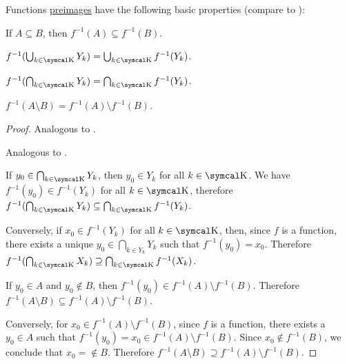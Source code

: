 \begin{proposition}\label{thm:function_preimage_properties}
  Functions \hyperref[def:function/preimage]{preimages} have the following basic properties (compare to ):
  \begin{PropEnum}
     If \( A \subseteq B \), then \( f^{-1}(A) \subseteq f^{-1}(B) \).

     \( f^{-1}(\bigcup_{k \in \CK} Y_k) = \bigcup_{k \in \CK} f^{-1}(Y_k) \).

     \( f^{-1}(\bigcap_{k \in \CK} Y_k) = \bigcap_{k \in \CK} f^{-1}(Y_k) \).

     \( f^{-1}(A \setminus B) = f^{-1}(A) \setminus f^{-1}(B) \).
  \end{PropEnum}
\end{proposition}
\begin{proof}
   Analogous to .

   Analogous to .

   If \( y_0 \in \bigcap_{k \in \CK} Y_{k} \), then \( y_0 \in Y_k \) for all \( k \in \CK \). We have \( f^{-1}(y_0) \in f^{-1}(Y_k) \) for all \( k \in \CK \), therefore \( f^{-1}(\bigcap_{k \in \CK} Y_k) \subseteq \bigcap_{k \in \CK} f^{-1}(Y_k) \).

  Conversely, if \( x_0 \in f^{-1}(Y_k) \) for all \( k \in \CK \), then, since \( f \) is a function, there exists a unique \( y_0 \in \bigcap_{k \in Y_k}Y_k \) such that \( f^{-1}(y_0) = x_0 \). Therefore \( f^{-1}(\bigcap_{k \in \CK} X_k) \supseteq \bigcap_{k \in \CK} f^{-1}(X_k) \).

   If \( y_0 \in A \) and \( y_0 \not\in B \), then \( f^{-1}(y_0) \in f^{-1}(A) \setminus f^{-1}(B) \). Therefore \( f^{-1}(A \setminus B) \subseteq f^{-1}(A) \setminus f^{-1}(B) \).

  Conversely, for \( x_0 \in f^{-1}(A) \setminus f^{-1}(B) \), since \( f \) is a function, there exists a \( y_0 \in A \) such that \( f^{-1}(y_0) = x_0 \in f^{-1}(A) \setminus f^{-1}(B) \). Since \( x_0 \not\in f^{-1}(B) \), we conclude that \( x_0 = \not\in B \). Therefore \( f^{-1}(A \setminus B) \supseteq f^{-1}(A) \setminus f^{-1}(B) \).
\end{proof}

